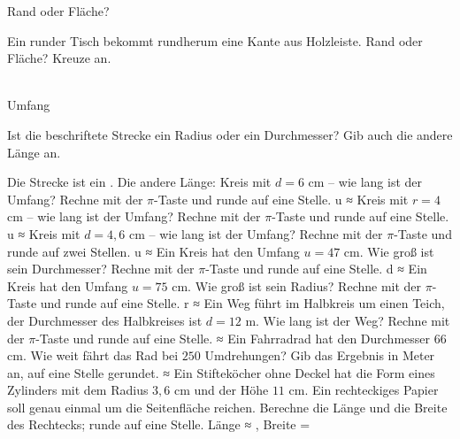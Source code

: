 \setcounter{aufgabe}{8}

\begin{aufgabe}{Rand oder Fläche?}
\begin{teile}
\teil Ein runder Tisch bekommt rundherum eine Kante aus Holzleiste. Rand oder Fläche? Kreuze an.\\ \\ 
\end{teile}
\end{aufgabe}

\begin{aufgabe}{Umfang}
\begin{teile}
\teil Ist die beschriftete Strecke ein Radius oder ein Durchmesser? Gib auch die andere Länge an.

\begin{kreis}[2]   \end{kreis}
Die Strecke ist ein \leerfeld . Die andere Länge: \leerfeld
\teil Kreis mit $d = 6$ cm – wie lang ist der Umfang? Rechne mit der $\pi$-Taste und runde auf eine Stelle. u ≈ \leerfeld[cm]
\teil Kreis mit $r = 4$ cm – wie lang ist der Umfang? Rechne mit der $\pi$-Taste und runde auf eine Stelle. u ≈ \leerfeld[cm]
\teil Kreis mit $d = 4{,}6$ cm – wie lang ist der Umfang? Rechne mit der $\pi$-Taste und runde auf zwei Stellen. u ≈ \leerfeld[cm]
\teil Ein Kreis hat den Umfang $u = 47$ cm. Wie groß ist sein Durchmesser? Rechne mit der $\pi$-Taste und runde auf eine Stelle. d ≈ \leerfeld[cm]
\teil Ein Kreis hat den Umfang $u = 75$ cm. Wie groß ist sein Radius? Rechne mit der $\pi$-Taste und runde auf eine Stelle. r ≈ \leerfeld[cm]
\teil Ein Weg führt im Halbkreis um einen Teich, der Durchmesser des Halbkreises ist $d = 12$ m. Wie lang ist der Weg? Rechne mit der $\pi$-Taste und runde auf eine Stelle. ≈ \leerfeld[m]
\teil Ein Fahrradrad hat den Durchmesser $66$ cm. Wie weit fährt das Rad bei $250$ Umdrehungen? Gib das Ergebnis in Meter an, auf eine Stelle gerundet. ≈ \leerfeld[m]
\teil Ein Stifteköcher ohne Deckel hat die Form eines Zylinders mit dem Radius $3{,}6$ cm und der Höhe $11$ cm. Ein rechteckiges Papier soll genau einmal um die Seitenfläche reichen. Berechne die Länge und die Breite des Rechtecks; runde auf eine Stelle. Länge ≈ \leerfeld[cm] , Breite = \leerfeld[cm]
\end{teile}
\end{aufgabe}

